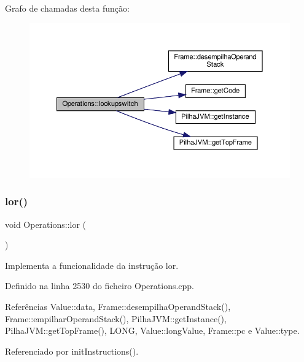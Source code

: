 Grafo de chamadas desta função\+:
\nopagebreak
\begin{figure}[H]
\begin{center}
\leavevmode
\includegraphics[width=350pt]{classOperations_a0458ee466daff63a3698973c89cfe71a_cgraph}
\end{center}
\end{figure}
\mbox{\label{classOperations_a89193dfaaa2c4c45f320c6b9f0b5601c}} 
\subsubsection{\texorpdfstring{lor()}{lor()}}
{\footnotesize\ttfamily void Operations\+::lor (\begin{DoxyParamCaption}{ }\end{DoxyParamCaption})\hspace{0.3cm}{\ttfamily [private]}}



Implementa a funcionalidade da instrução lor. 



Definido na linha 2530 do ficheiro Operations.\+cpp.



Referências Value\+::data, Frame\+::desempilha\+Operand\+Stack(), Frame\+::empilhar\+Operand\+Stack(), Pilha\+J\+V\+M\+::get\+Instance(), Pilha\+J\+V\+M\+::get\+Top\+Frame(), L\+O\+NG, Value\+::long\+Value, Frame\+::pc e Value\+::type.



Referenciado por init\+Instructions().

